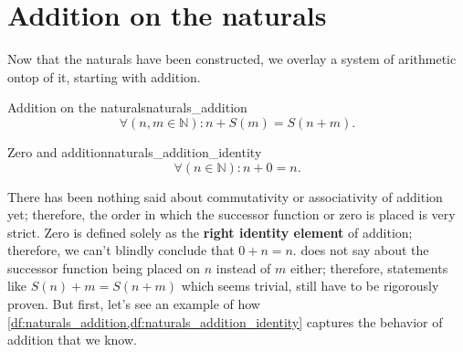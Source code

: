 \section{Addition on the naturals}


Now that the naturals have been constructed, we overlay a system of arithmetic ontop of it, starting
with addition.
\begin{df}{Addition on the naturals}{naturals_addition}
  \begin{equation}
    \forall(n, m \in \mathbb{N}) : n + S(m) = S(n + m).
  \end{equation}
\end{df}
\begin{df}{Zero and addition}{naturals_addition_identity}
  \begin{equation}
    \forall(n \in \mathbb{N}) : n + 0 = n.
  \end{equation}
\end{df}

There has been nothing said about commutativity or associativity of addition yet; therefore, the
order in which the successor function or zero is placed is very strict. Zero is defined solely as
the \textbf{right identity element} of addition; therefore, we can't blindly conclude that
\(0 + n = n\).  does not say about the successor function being placed on
\(n\) instead of \(m\) either; therefore, statements like \(S(n) + m = S(n + m)\) which seems
trivial, still have to be rigorously proven. But first, let's see an example of how
\cref{df:naturals_addition,df:naturals_addition_identity} captures the behavior of addition that we
know.

